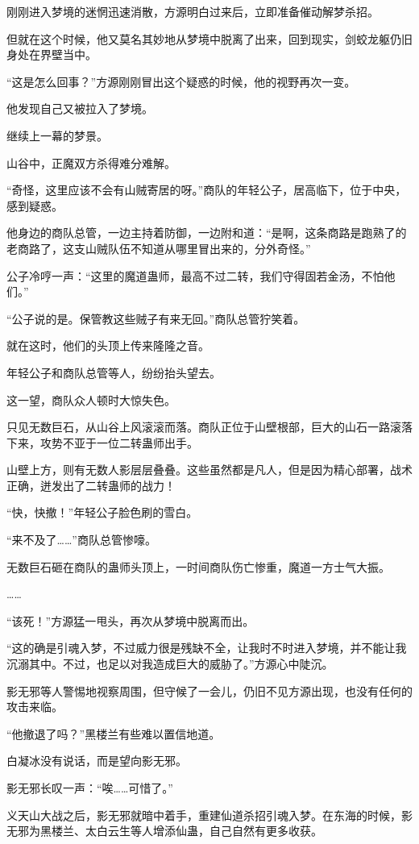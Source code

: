 \begin{this_body}
刚刚进入梦境的迷惘迅速消散，方源明白过来后，立即准备催动解梦杀招。

但就在这个时候，他又莫名其妙地从梦境中脱离了出来，回到现实，剑蛟龙躯仍旧身处在界壁当中。

“这是怎么回事？”方源刚刚冒出这个疑惑的时候，他的视野再次一变。

他发现自己又被拉入了梦境。

继续上一幕的梦景。

山谷中，正魔双方杀得难分难解。

“奇怪，这里应该不会有山贼寄居的呀。”商队的年轻公子，居高临下，位于中央，感到疑惑。

他身边的商队总管，一边主持着防御，一边附和道：“是啊，这条商路是跑熟了的老商路了，这支山贼队伍不知道从哪里冒出来的，分外奇怪。”

公子冷哼一声：“这里的魔道蛊师，最高不过二转，我们守得固若金汤，不怕他们。”

“公子说的是。保管教这些贼子有来无回。”商队总管狞笑着。

就在这时，他们的头顶上传来隆隆之音。

年轻公子和商队总管等人，纷纷抬头望去。

这一望，商队众人顿时大惊失色。

只见无数巨石，从山谷上风滚滚而落。商队正位于山壁根部，巨大的山石一路滚落下来，攻势不亚于一位二转蛊师出手。

山壁上方，则有无数人影层层叠叠。这些虽然都是凡人，但是因为精心部署，战术正确，迸发出了二转蛊师的战力！

“快，快撤！”年轻公子脸色刷的雪白。

“来不及了……”商队总管惨嚎。

无数巨石砸在商队的蛊师头顶上，一时间商队伤亡惨重，魔道一方士气大振。

……

“该死！”方源猛一甩头，再次从梦境中脱离而出。

“这的确是引魂入梦，不过威力很是残缺不全，让我时不时进入梦境，并不能让我沉溺其中。不过，也足以对我造成巨大的威胁了。”方源心中陡沉。

影无邪等人警惕地视察周围，但守候了一会儿，仍旧不见方源出现，也没有任何的攻击来临。

“他撤退了吗？”黑楼兰有些难以置信地道。

白凝冰没有说话，而是望向影无邪。

影无邪长叹一声：“唉……可惜了。”

义天山大战之后，影无邪就暗中着手，重建仙道杀招引魂入梦。在东海的时候，影无邪为黑楼兰、太白云生等人增添仙蛊，自己自然有更多收获。


\end{this_body}
